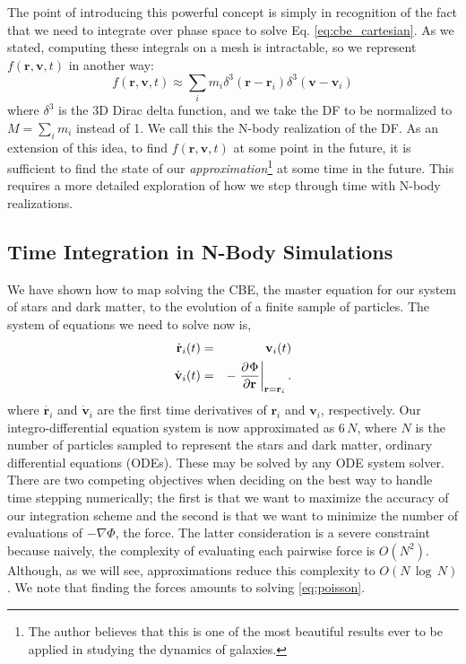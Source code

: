 The point of introducing this powerful concept is simply in recognition of the fact that we need to integrate over phase space to solve Eq. \eqref{eq:cbe_cartesian}. As we stated, computing these integrals on a mesh is intractable, so we represent $f(\textbf{r},\textbf{v},t)$ in another way:
\begin{equation}
f(\textbf{r},\textbf{v},t) \approx \sum_i m_i \delta^3(\textbf{r} - \textbf{r}_i) \delta^3(\textbf{v} - \textbf{v}_i)
\end{equation}
where $\delta^3$ is the 3D Dirac delta function, and we take the DF to be normalized to $M = \sum_i m_i$ instead of 1. We call this the N-body realization of the DF. As an extension of this idea, to find $f(\textbf{r},\textbf{v},t)$ at some point in the future, it is sufficient to find the state of our \textit{approximation}\footnote{The author believes that this is one of the most beautiful results ever to be applied in studying the dynamics of galaxies.} at some time in the future. This requires a more detailed exploration of how we step through time with N-body realizations.

\subsection{Time Integration in N-Body Simulations} \label{ssec:time_int}

We have shown how to map solving the CBE, the master equation for our system of stars and dark matter, to the evolution of a finite sample of particles. The system of equations we need to solve now is,
\begin{eqnarray} 
\dot{\textbf{r}}_i(t) &=& \textbf{v}_i(t)\label{eq:nbody_system_1}\\
\dot{\textbf{v}}_i(t) &=& -\left.\frac{\partial^{} {\Phi}}{\partial {\textbf{r}}^{}}\right\vert_{\textbf{r} = \textbf{r}_i}.\label{eq:nbody_system_2}
\end{eqnarray}
where $\dot{\textbf{r}_i}$ and $\dot{\textbf{v}}_i$ are the first time derivatives of $\textbf{r}_i$ and $\textbf{v}_i$, respectively. Our integro-differential equation system is now approximated as $6\,N$, where $N$ is the number of particles sampled to represent the stars and dark matter, ordinary differential equations (ODEs). These may be solved by any ODE system solver. There are two competing objectives when deciding on the best way to handle time stepping numerically; the first is that we want to maximize the accuracy of our integration scheme and the second is that we want to minimize the number of evaluations of $-\nabla \Phi$, the force. The latter consideration is a severe constraint because naively, the complexity of evaluating each pairwise force is $O(N^2)$.  Although, as we will see, approximations reduce this complexity to $O(N\,\log \, N)$. We note that finding the forces amounts to solving \eqref{eq:poisson}.

